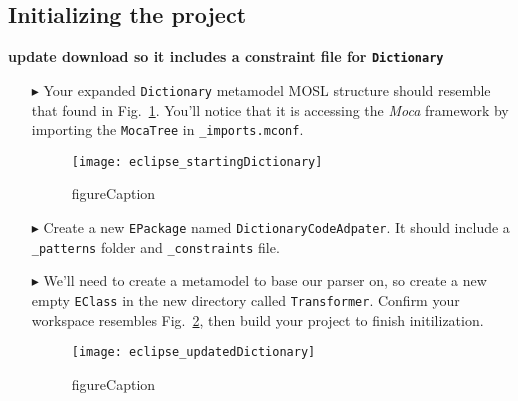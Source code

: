 \newpage
\hypertarget{M2TSettingUp tex}{}
\subsection{Initializing the project}
\texHeader

{\bf update download so it includes a constraint file for \texttt{Dictionary}}

\begin{enumerate}

\item[$\blacktriangleright$] Your expanded \texttt{Dictionary} metamodel MOSL structure should resemble that found in Fig.~\ref{eclipse:startDictionary}. You'll
notice that it is accessing the \emph{Moca} framework by importing the \texttt{MocaTree} in \texttt{\_imports.mconf}.

\begin{figure}[htpb]
\begin{center}
  \texttt{[image: eclipse\_startingDictionary]}
  \caption{figureCaption}
  \label{eclipse:startDictionary}
\end{center}
\end{figure}

\item[$\blacktriangleright$] Create a new \texttt{EPackage} named \texttt{DictionaryCodeAdpater}. It should include a \texttt{\_patterns} folder and
\texttt{\_constraints} file.

\item[$\blacktriangleright$] We'll need to create a metamodel to base our parser on, so create a new empty \texttt{EClass} in the new directory called
\texttt{Transformer}. Confirm your workspace resembles Fig.~\ref{eclipse:updatedDictionary}, then build your project to finish initilization.

\newpage

\begin{figure}[htpb]
\begin{center}
  \texttt{[image: eclipse\_updatedDictionary]}
  \caption{figureCaption}
  \label{eclipse:updatedDictionary}
\end{center}
\end{figure}

\end{enumerate}
